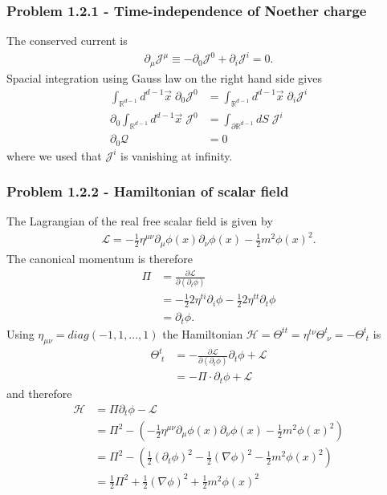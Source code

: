 \documentclass[10pt,a4paper]{article}
\theoremstyle{definition}
\begin{document}
\subsubsection{Problem 1.2.1 - Time-independence of Noether charge}
The conserved current is
\begin{align}
    \partial_\mu\mathcal{J}^\mu\equiv-\partial_0\mathcal{J}^0+\partial_i\mathcal{J}^i=0.
\end{align}
Spacial integration using Gauss law on the right hand side gives
\begin{align}
    \int_{\mathbb{R}^{d-1}} d^{d-1}\vec{x}\;\partial_0\mathcal{J}^0&=\int_{\mathbb{R}^{d-1}} d^{d-1}\vec{x}\;\partial_i\mathcal{J}^i\\
    \partial_0\int_{\mathbb{R}^{d-1}} d^{d-1}\vec{x}\;\mathcal{J}^0&=\int_{\partial\mathbb{R}^{d-1}} dS\;\mathcal{J}^i\\
    \partial_0\mathcal{Q}&=0
\end{align}
where we used that $\mathcal{J}^i$ is vanishing at infinity.

\subsubsection{Problem 1.2.2 - Hamiltonian of scalar field}
The Lagrangian of the real free scalar field is given by 
\begin{align}
    \mathcal{L}=-\frac{1}{2}\eta^{\mu\nu}\partial_\mu\phi(x)\partial_\nu\phi(x)-\frac{1}{2}m^2\phi(x)^2.
\end{align}
The canonical momentum is therefore
\begin{align}
    \Pi &= \frac{\partial\mathcal{L}}{\partial(\partial_t\phi)}\\
    &=-\frac{1}{2}2\eta^{ti}\partial_i\phi -\frac{1}{2}2\eta^{tt}\partial_t\phi\\
    &=\partial_t\phi.
\end{align}
Using $\eta_{\mu\nu}=diag(-1,1,...,1)$ the Hamiltonian $\mathcal{H}=\Theta^{tt}=\eta^{t\nu}\Theta^t_{\;\nu}=-\Theta^t_{\;t}$ is 
\begin{align}
    \Theta^t_{\;t}
    &=-\frac{\partial\mathcal{L}}{\partial(\partial_t\phi)}\partial_t\phi+\mathcal{L}\\
    &=-\Pi\cdot\partial_t\phi+\mathcal{L}
\end{align}
and therefore
\begin{align}
    \mathcal{H}&=\Pi\partial_t\phi-\mathcal{L}\\
    &=\Pi^2-\left(-\frac{1}{2}\eta^{\mu\nu}\partial_\mu\phi(x)\partial_\nu\phi(x)-\frac{1}{2}m^2\phi(x)^2\right)\\
    &=\Pi^2-\left(\frac{1}{2}(\partial_t\phi)^2-\frac{1}{2}(\nabla\phi)^2-\frac{1}{2}m^2\phi(x)^2\right)\\
    &=\frac{1}{2}\Pi^2+\frac{1}{2}(\nabla\phi)^2+\frac{1}{2}m^2\phi(x)^2
\end{align}
\end{document}
